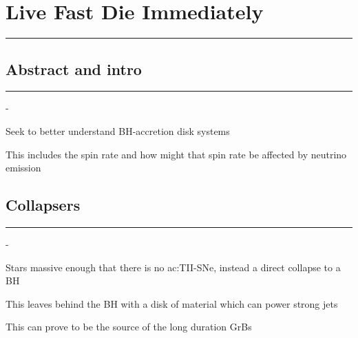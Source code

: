 \pagebreak
\chapter{Live Fast Die Immediately \cite{Hoosain2026} \label{chap:Livefastdie}}
\hrule
\vspace{.5cm}

\section{Abstract and intro}
\hrule
\vspace{.5cm}

\begin{list}{-}{}
\item Seek to better understand BH-accretion disk systems 
\item This includes the spin rate and how might that spin rate be affected by neutrino emission
\end{list}

\section{Collapsers}
\label{Collapsers}
\hrule
\vspace{.5cm}
\begin{list}{-}{}
\item Stars massive enough that there is no \gls{ac:TII-SNe}, instead a direct collapse to a BH
\item This leaves behind the BH with a disk of material which can power strong jets
\item This can prove to be the source of the long duration GrBs 
\end{list}

